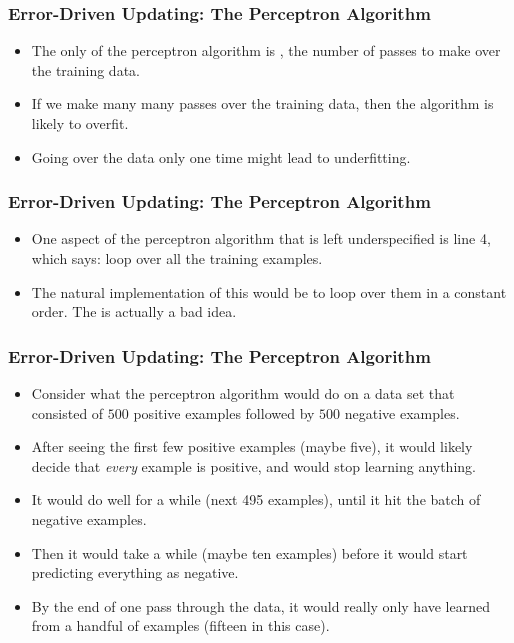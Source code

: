 \documentclass[trans]{beamer}
\begin{document}
\begin{frame}
  \frametitle{Error-Driven Updating: The Perceptron Algorithm}
\begin{itemize}
\item
The only  of the perceptron algorithm is
, the number of passes to make over the training data.
\item If we make many many passes over the training data, then the algorithm
is likely to overfit.
\item Going
over the data only one time might lead to underfitting.  
\end{itemize}

\end{frame}

\begin{frame}
  \frametitle{Error-Driven Updating: The Perceptron Algorithm}
\begin{itemize}
\item
One aspect of the perceptron algorithm that is left underspecified is
line 4, which says: loop over all the training examples. 
\item  The natural
implementation of this would be to loop over them in a constant
order.  The is actually a bad idea.
\end{itemize}
\end{frame}

\begin{frame}
  \frametitle{Error-Driven Updating: The Perceptron Algorithm}
\begin{itemize}
\item
Consider what the perceptron algorithm would do on a data set that
consisted of $500$ positive examples followed by $500$ negative
examples.
\item  After seeing the first few positive examples (maybe five),
it would likely decide that \emph{every} example is positive, and
would stop learning anything. 
\item  It would do well for a while (next 495
examples), until it hit the batch of negative examples. 
\item  Then it would
take a while (maybe ten examples) before it would start predicting
everything as negative. 
\item  By the end of one pass through the data, it
would really only have learned from a handful of examples (fifteen in
this case).
\end{itemize}
\end{frame}
\end{document}
